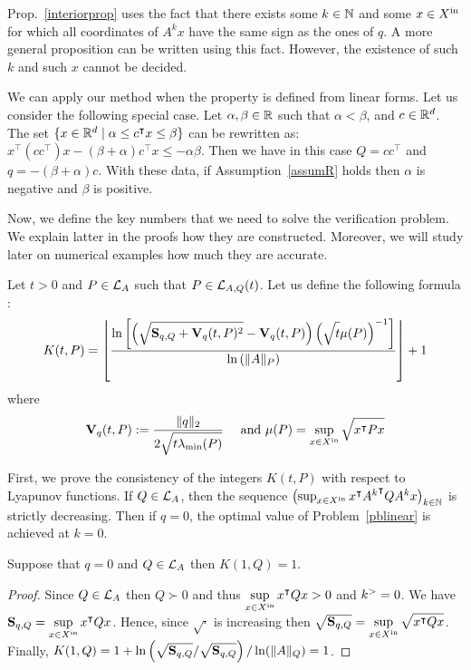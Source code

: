 \documentclass[10pt]{article}
\begin{document}
Prop.~\ref{interiorprop} uses the fact that there exists some $k\in\mathbb{N}$ and some $x\in X^\mathrm{in}$ for which all coordinates of $A^k x$ have the same sign as the ones of $q$. A more general proposition can be written using this fact. However, the existence of such $k$ and such $x$ cannot be decided.     
 
\begin{remark}
\label{remarklinear}
We can apply our method when the property is defined from linear forms. 
Let us consider the following special case. Let $\alpha,\beta\in\mathbb R$ such that $\alpha<\beta$, and $c\in\mathbb R^d$. The set $\{x\in\mathbb R^d \mid \alpha \leq c^\intercal x\leq \beta\}$ can be rewritten as:
$x^\intercal (c c^\intercal) x-(\beta+\alpha) c^\intercal x \leq -\alpha \beta$. Then we have in this case $Q=c c^\intercal$ and $q= -(\beta+\alpha) c$. With these data, if Assumption~\ref{assumR} holds then $\alpha$ is negative and $\beta$ is positive. 
\end{remark}

Now, we define the key numbers that we need to solve the verification problem. We explain latter in the proofs how they are constructed. Moreover, we will study later on numerical examples how much they are accurate.  


Let $t>0$ and $P\in\mathcal{L}_{A}$ such that $P\in \mathcal{L}_{A,Q}(t)$. Let us define the following formula :
\begin{equation}
\label{intgfond}
K(t,P)=\left\lfloor \dfrac{\ln\left[\left(\sqrt{\strut \mathbf{S}_{q,Q}+\mathbf{V}_{q}(t,P)^2}-\mathbf{V}_{q}(t,P)\right)\left(\sqrt{\strut t}\mu(P)\right)^{-1}\right]}{\ln\left(\| A\|_P\right)}\right\rfloor+1
\end{equation}
where 
\[
\mathbf{V}_{q}(t,P):=\dfrac{\| q\|_2 }{2\sqrt{\strut t\lambda_{\operatorname{min}}(P)}}\quad \text{ and } \mu(P)=\sup_{x\in X^\mathrm{in}} \sqrt{\strut x^\intercal P x}
\]

First, we prove the consistency of the integers $K(t,P)$ with respect to Lyapunov functions. If $Q\in\mathcal{L}_{A}$, then the sequence $\left(\sup_{x\in X^\mathrm{in}} x^\intercal {A^k}^\intercal Q A^k x\right)_{k\in\mathbb{N}}$ is strictly decreasing. Then if $q=0$, the optimal value of Problem~\eqref{pblinear} is achieved at $k=0$. 
\begin{prop}
\label{lyapunovbigk}
Suppose that $q=0$ and $Q\in\mathcal{L}_{A}$ then $K(1,Q)=1$.  
\end{prop}

\begin{proof}
Since $Q\in\mathcal{L}_{A}$ then $Q\succ 0$ and thus $\displaystyle{\sup_{x\in X^\mathrm{in}} x^\intercal Q x>0}$ and $k^{>}=0$. We have $\mathbf{S}_{q,Q}=\displaystyle{\sup_{x\in X^\mathrm{in}} x^\intercal Q x}$. Hence, since 
$\sqrt{\cdot}$ is increasing then $\sqrt{\mathbf{S}_{q,Q}}=\displaystyle{\sup_{x\in X^\mathrm{in}} \sqrt{x^\intercal Q x}}$. Finally, $K(1,Q)=1+\displaystyle{\ln\left(\sqrt{\mathbf{S}_{q,Q}}/\sqrt{\mathbf{S}_{q,Q}}\right) / \ln(\| A\|_Q)}=1$.
\end{proof}
\end{document}
